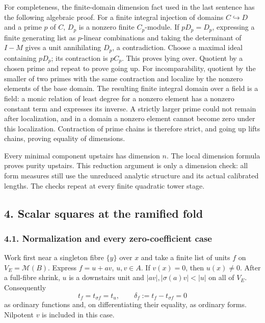 \documentclass[
  11pt,
]{article}
\begin{document}
For completeness, the finite-domain dimension fact used in the last
sentence has the following algebraic proof. For a finite integral
injection of domains \(C\hookrightarrow D\) and a prime \(p\) of \(C\),
\(D_p\) is a nonzero finite \(C_p\)-module. If \(pD_p=D_p\), expressing
a finite generating list as \(p\)-linear combinations and taking the
determinant of \(I-M\) gives a unit annihilating \(D_p\), a
contradiction. Choose a maximal ideal containing \(pD_p\); its
contraction is \(pC_p\). This proves lying over. Quotient by a chosen
prime and repeat to prove going up. For incomparability, quotient by the
smaller of two primes with the same contraction and localize by the
nonzero elements of the base domain. The resulting finite integral
domain over a field is a field: a monic relation of least degree for a
nonzero element has a nonzero constant term and expresses its inverse. A
strictly larger prime could not remain after localization, and in a
domain a nonzero element cannot become zero under this localization.
Contraction of prime chains is therefore strict, and going up lifts
chains, proving equality of dimensions.

Every minimal component upstairs has dimension \(n\). The local
dimension formula proves purity upstairs. This reduction argument is
only a dimension check: all form measures still use the unreduced
analytic structure and its actual calibrated lengths. The checks repeat
at every finite quadratic tower stage.

\subsection{4. Scalar squares at the ramified
fold}\label{scalar-squares-at-the-ramified-fold}

\subsubsection{4.1. Normalization and every zero-coefficient
case}\label{normalization-and-every-zero-coefficient-case}

Work first near a singleton fibre \(\{y\}\) over \(x\) and take a finite
list of units \(f\) on \(V_E=\mathcal M(B)\). Express \(f=u+av\),
\(u,v\in A\). If \(v(x)=0\), then \(u(x)\ne0\). After a full-fibre
shrink, \(u\) is a downstairs unit and \(|av|,|\sigma(a)v|<|u|\) on all
of \(V_E\). Consequently \[
 t_f=t_{\sigma f}=t_u,\qquad \delta_f:=t_f-t_{\sigma f}=0     \tag{5}
\] as ordinary functions and, on differentiating their equality, as
ordinary forms. Nilpotent \(v\) is included in this case.
\end{document}

